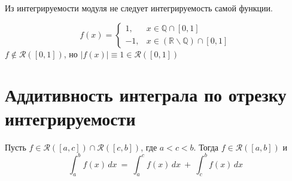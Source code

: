 \documentclass[11pt]{article}
\begin{document}
\begin{remark}
  Из интегрируемости модуля не следует интегрируемость самой функции.
\end{remark}

\begin{example}
  \[f(x) = \begin{cases}
    1, & x \in \mathbb{Q} \cap [0, 1] \\
    -1, & x \in (\mathbb{R} \backslash \mathbb{Q}) \cap [0, 1]
  \end{cases}\]
  $f \notin \mathcal{R}([0, 1])$, но $\left\lvert f(x) \right\rvert \equiv 1 
  \in \mathcal{R}([0, 1])$
\end{example}

\section{Аддитивность интеграла по отрезку интегрируемости}

\begin{theorem}
  Пусть $f \in \mathcal{R}([a, c]) \cap \mathcal{R}([c, b])$, где $a < c < b$. 
  Тогда $f \in \mathcal{R}([a, b])$ и 
  \[\int_{a}^{b} f(x)\,dx \ = \ \int_{a}^{c} f(x)\,dx \ + \ \int_{c}^{b} f(x)\,dx\]
\end{theorem}
\end{document}
